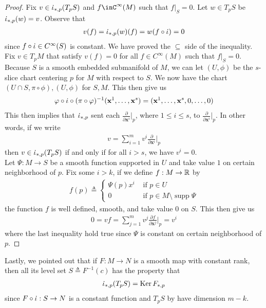 \documentclass{report}
\begin{document}
\begin{proof}
Fix $v\in \dot{\iota}_{*,p}(T_pS)$ and $f\inC^{\infty}(M)$ such that $f|_S=0$. Let $w\in T_pS$ be $\dot{\iota}_{*,p}(w)=v $. Observe that 
\begin{align*}
v(f)=\dot{\iota}_{*,p}(w)(f)= w(f\circ \dot{\iota})=0
\end{align*}
since $f\circ \dot{\iota}\in C^{\infty}(S)$ is constant. We have proved the $\subseteq$ side of the inequality. \\

Fix $v \in T_pM$ that satisfy $v(f)=0$ for all $f\in C^{\infty}(M)$ such that $f|_S=0$. Because $S$ is a smooth embedded submanifold of  $M$, we can let $(U,\phi)$ be the $s$-slice chart centering $p$ for  $M$ with respect to  $S$. We now have the chart $(U\cap S,\pi \circ \phi),(U,\phi)$ for $S,M$. This then give us 
\begin{align*}
\varphi \circ \dot{\iota} \circ (\pi \circ \varphi )^{-1}(\textbf{x}^1,\dots ,\textbf{x}^s)=(\textbf{x}^1,\dots ,\textbf{x}^s ,0,\dots ,0)
\end{align*}
This then implies that $\dot{\iota}_{*,p}$ sent each $\frac{\partial }{\partial \textbf{x}^i}\big|_p$, where $1\leq i\leq s$, to $\frac{\partial }{\partial \textbf{x}^i}\big|_p$. In other words, if we write 
\begin{align*}
  v=\sum_{i=1}^m v^i \frac{\partial }{\partial \textbf{x}^i}\Big|_p
\end{align*}
then $v\in \dot{\iota}_{*,p}(T_pS)$ if and only if for all $i>s$, we have  $v^i=0$.\\

Let $\Psi:M\rightarrow S$ be a smooth function supported in $U$ and take value  $1$ on certain neighborhood of  $p$. Fix some $i>k$, if we define $f:M\rightarrow \mathbb{R}$ by 
 \begin{align*}
f(p)\triangleq \begin{cases}
  \Psi (p) x^i& \text{ if }p \in U \\
  0& \text{ if $p\in M \setminus \operatorname{supp}\Psi$}
\end{cases}
\end{align*}
the function $f$ is well defined, smooth, and take value $0$ on $S$. This then give us 
\begin{align*}
0=vf=\sum_{j=1}^m v^j \frac{\partial f}{\partial \textbf{x}^j}\Big|_p=v^i 
\end{align*}
where the last inequality hold true since $\Psi$ is constant on certain neighborhood of $p$. 
\end{proof}
\begin{mdframed}
Lastly, we pointed out that if $F:M\rightarrow N$ is a smooth map with constant rank, then all its level set $S\triangleq F^{-1}(c)$  has the property that 
\begin{align*}
\dot{\iota}_{*,p}(T_pS)= \operatorname{Ker}F_{*,p} 
\end{align*}
since $F\circ \dot{\iota}:S\rightarrow N$ is a constant function and $T_pS$ by   have dimension $m-k$. 
\end{mdframed}
\end{document}
